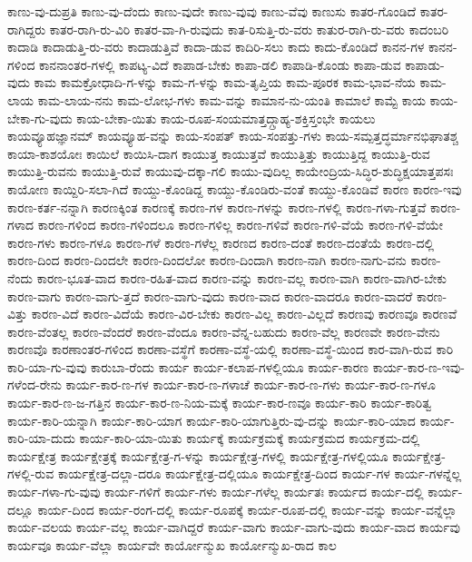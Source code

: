 {ಕಾಣು-ವು-ದುಪ್ರತಿ
ಕಾಣು-ವು-ದೆಂದು
ಕಾಣು-ವುದೇ
ಕಾಣು-ವುವು
ಕಾಣು-ವೆವು
ಕಾಣುಸು
ಕಾತರ-ಗೊಂಡಿದೆ
ಕಾತರ-ರಾಗಿದ್ದರು
ಕಾತರ-ರಾಗಿ-ರು-ವಿರಿ
ಕಾತರ-ವಾ-ಗಿ-ರುವುದು
ಕಾತ-ರಿಸುತ್ತಿ-ರು-ವರು
ಕಾತುರ-ರಾಗಿ-ರು-ವರು
ಕಾದಂಬರಿ
ಕಾದಾಡಿ
ಕಾದಾಡುತ್ತಿ-ರು-ವರು
ಕಾದಾಡುತ್ತಿವೆ
ಕಾದಾ-ಡುವ
ಕಾದಿರಿ-ಸಲು
ಕಾದು
ಕಾದು-ಕೊಂಡಿದೆ
ಕಾನನ-ಗಳ
ಕಾನನ-ಗಳಿಂದ
ಕಾನನಾಂತರ-ಗಳಲ್ಲಿ
ಕಾಪಟ್ಯ-ವಿದೆ
ಕಾಪಾಡ-ಬೇಕು
ಕಾಪಾ-ಡಲಿ
ಕಾಪಾಡಿ-ಕೊಂಡು
ಕಾಪಾ-ಡುವ
ಕಾಪಾಡು-ವುದು
ಕಾಮ
ಕಾಮಕ್ರೋಧಾದಿ-ಗ-ಳನ್ನು
ಕಾಮ-ಗ-ಳನ್ನು
ಕಾಮ-ತೃಪ್ತಿಯ
ಕಾಮ-ಪೂರಕ
ಕಾಮ-ಭಾವ-ನೆಯ
ಕಾಮ-ಲಾಯ
ಕಾಮ-ಲಾಯ-ನನು
ಕಾಮ-ಲೋಭ-ಗಳು
ಕಾಮ-ವನ್ನು
ಕಾಮಾನ-ನು-ಯಂತಿ
ಕಾಮಾಲೆ
ಕಾಮ್ಟೆ
ಕಾಯ
ಕಾಯ-ಬೇಕಾ-ಗು-ವುದು
ಕಾಯ-ಬೇಕಾ-ಯಿತು
ಕಾಯ-ರೂಪ-ಸಂಯಮಾತ್ತದ್ಗ್ರಾಹ್ಯ-ಶಕ್ತಿಸ್ತಂಭೇ
ಕಾಯಲು
ಕಾಯವ್ಯೂಹಜ್ಞಾನಮ್
ಕಾಯವ್ಯೂಹ-ವನ್ನು
ಕಾಯ-ಸಂಪತ್
ಕಾಯ-ಸಂಪತ್ತು-ಗಳು
ಕಾಯ-ಸಮ್ಪತ್ತದ್ಧರ್ಮಾನಭಿಘಾತಶ್ಚ
ಕಾಯಾ-ಕಾಶಯೋಃ
ಕಾಯಿಲೆ
ಕಾಯಿಸಿ-ದಾಗ
ಕಾಯುತ್ತ
ಕಾಯುತ್ತವೆ
ಕಾಯುತ್ತಿತ್ತು
ಕಾಯುತ್ತಿದ್ದ
ಕಾಯುತ್ತಿ-ರುವ
ಕಾಯುತ್ತಿ-ರುವನು
ಕಾಯುತ್ತಿ-ರುವೆ
ಕಾಯುವು-ದಕ್ಕಾ-ಗಲಿ
ಕಾಯು-ವುದಿಲ್ಲ
ಕಾಯೇಂದ್ರಿಯ-ಸಿದ್ಧಿರ-ಶುದ್ಧಿಕ್ಷಯಾತ್ತಪಸಃ
ಕಾಯೋಣ
ಕಾಯ್ದಿರಿ-ಸಲಾ-ಗಿದೆ
ಕಾಯ್ದು-ಕೊಂಡಿದ್ದ
ಕಾಯ್ದು-ಕೊಂಡಿರು-ವಂತೆ
ಕಾಯ್ದು-ಕೊಂಡಿವೆ
ಕಾರಣ
ಕಾರಣ-ಇವು
ಕಾರಣ-ಕರ್ತ-ನನ್ನಾಗಿ
ಕಾರಣಕ್ಕಿಂತ
ಕಾರಣಕ್ಕೆ
ಕಾರಣ-ಗಳ
ಕಾರಣ-ಗಳನ್ನು
ಕಾರಣ-ಗಳಲ್ಲಿ
ಕಾರಣ-ಗಳಾ-ಗುತ್ತವೆ
ಕಾರಣ-ಗಳಾದ
ಕಾರಣ-ಗಳಿಂದ
ಕಾರಣ-ಗಳಿಂದಲೂ
ಕಾರಣ-ಗಳಿಲ್ಲ
ಕಾರಣ-ಗಳಿವೆ
ಕಾರಣ-ಗಳಿ-ವೆಯೆ
ಕಾರಣ-ಗಳಿ-ವೆಯೇ
ಕಾರಣ-ಗಳು
ಕಾರಣ-ಗಳೂ
ಕಾರಣ-ಗಳೆ
ಕಾರಣ-ಗಳೆಲ್ಲ
ಕಾರಣದ
ಕಾರಣ-ದಂತೆ
ಕಾರಣ-ದಂತೆಯೆ
ಕಾರಣ-ದಲ್ಲಿ
ಕಾರಣ-ದಿಂದ
ಕಾರಣ-ದಿಂದಲೇ
ಕಾರಣ-ದಿಂದಲೋ
ಕಾರಣ-ದಿಂದಾಗಿ
ಕಾರಣ-ನಾಗಿ
ಕಾರಣ-ನಾಗು-ವನು
ಕಾರಣ-ನೆಂದು
ಕಾರಣ-ಭೂತ-ವಾದ
ಕಾರಣ-ರಹಿತ-ವಾದ
ಕಾರಣ-ವನ್ನು
ಕಾರಣ-ವಲ್ಲ
ಕಾರಣ-ವಾಗಿ
ಕಾರಣ-ವಾಗಿರ-ಬೇಕು
ಕಾರಣ-ವಾಗು
ಕಾರಣ-ವಾಗು-ತ್ತದೆ
ಕಾರಣ-ವಾಗು-ವುದು
ಕಾರಣ-ವಾದ
ಕಾರಣ-ವಾದರೂ
ಕಾರಣ-ವಾದರೆ
ಕಾರಣ-ವಿತ್ತು
ಕಾರಣ-ವಿದೆ
ಕಾರಣ-ವಿದೆಯೆ
ಕಾರಣ-ವಿರ-ಬೇಕು
ಕಾರಣ-ವಿಲ್ಲ
ಕಾರಣ-ವಿಲ್ಲದೆ
ಕಾರಣವು
ಕಾರಣವೂ
ಕಾರಣವೆ
ಕಾರಣ-ವೆಂತಲ್ಲ
ಕಾರಣ-ವೆಂದರೆ
ಕಾರಣ-ವೆಂದೂ
ಕಾರಣ-ವೆನ್ನ-ಬಹುದು
ಕಾರಣ-ವೆಲ್ಲ
ಕಾರಣವೇ
ಕಾರಣ-ವೇನು
ಕಾರಣವೊ
ಕಾರಣಾಂತರ-ಗಳಿಂದ
ಕಾರಣಾ-ವಸ್ಥೆಗೆ
ಕಾರಣಾ-ವಸ್ಥೆ-ಯಲ್ಲಿ
ಕಾರಣಾ-ವಸ್ಥೆ-ಯಿಂದ
ಕಾರ-ವಾಗಿ-ರುವ
ಕಾರಿ
ಕಾರಿ-ಯಾ-ಗು-ವುವು
ಕಾರುಬಾ-ರೆಂದು
ಕಾರ್ಯ
ಕಾರ್ಯ-ಕಲಾಪ-ಗಳಲ್ಲಿಯೂ
ಕಾರ್ಯ-ಕಾರಣ
ಕಾರ್ಯ-ಕಾರ-ಣ-ಇವು-ಗಳೆಂದ-ರೇನು
ಕಾರ್ಯ-ಕಾರ-ಣ-ಗಳ
ಕಾರ್ಯ-ಕಾರ-ಣ-ಗಳಾಚೆ
ಕಾರ್ಯ-ಕಾರ-ಣ-ಗಳು
ಕಾರ್ಯ-ಕಾರ-ಣ-ಗಳೂ
ಕಾರ್ಯ-ಕಾರ-ಣ-ಜ-ಗತ್ತಿನ
ಕಾರ್ಯ-ಕಾರ-ಣ-ನಿಯ-ಮಕ್ಕೆ
ಕಾರ್ಯ-ಕಾರ-ಣವೂ
ಕಾರ್ಯ-ಕಾರಿ
ಕಾರ್ಯ-ಕಾರಿತ್ವ
ಕಾರ್ಯ-ಕಾರಿ-ಯನ್ನಾಗಿ
ಕಾರ್ಯ-ಕಾರಿ-ಯಾಗ
ಕಾರ್ಯ-ಕಾರಿ-ಯಾಗುತ್ತಿರು-ವು-ದನ್ನು
ಕಾರ್ಯ-ಕಾರಿ-ಯಾದ
ಕಾರ್ಯ-ಕಾರಿ-ಯಾ-ದುದು
ಕಾರ್ಯ-ಕಾರಿ-ಯಾ-ಯಿತು
ಕಾರ್ಯಕ್ಕೆ
ಕಾರ್ಯಕ್ರಮಕ್ಕೆ
ಕಾರ್ಯಕ್ರಮದ
ಕಾರ್ಯಕ್ರಮ-ದಲ್ಲಿ
ಕಾರ್ಯಕ್ಷೇತ್ರ
ಕಾರ್ಯಕ್ಷೇತ್ರಕ್ಕೆ
ಕಾರ್ಯಕ್ಷೇತ್ರ-ಗ-ಳನ್ನು
ಕಾರ್ಯಕ್ಷೇತ್ರ-ಗಳಲ್ಲಿ
ಕಾರ್ಯಕ್ಷೇತ್ರ-ಗಳಲ್ಲಿಯೂ
ಕಾರ್ಯಕ್ಷೇತ್ರ-ಗಳಲ್ಲಿ-ರುವ
ಕಾರ್ಯಕ್ಷೇತ್ರ-ದಲ್ಲಾ-ದರೂ
ಕಾರ್ಯಕ್ಷೇತ್ರ-ದಲ್ಲಿಯೂ
ಕಾರ್ಯಕ್ಷೇತ್ರ-ದಿಂದ
ಕಾರ್ಯ-ಗಳ
ಕಾರ್ಯ-ಗಳನ್ನೆಲ್ಲ
ಕಾರ್ಯ-ಗಳಾ-ಗು-ವುವು
ಕಾರ್ಯ-ಗಳಿಗೆ
ಕಾರ್ಯ-ಗಳು
ಕಾರ್ಯ-ಗಳೆಲ್ಲ
ಕಾರ್ಯತಃ
ಕಾರ್ಯದ
ಕಾರ್ಯ-ದಲ್ಲಿ
ಕಾರ್ಯ-ದಲ್ಲೂ
ಕಾರ್ಯ-ದಿಂದ
ಕಾರ್ಯ-ರಂಗ-ದಲ್ಲಿ
ಕಾರ್ಯ-ರೂಪಕ್ಕೆ
ಕಾರ್ಯ-ರೂಪ-ದಲ್ಲಿ
ಕಾರ್ಯ-ವನ್ನು
ಕಾರ್ಯ-ವನ್ನೆಲ್ಲಾ
ಕಾರ್ಯ-ವಲಯ
ಕಾರ್ಯ-ವಲ್ಲ
ಕಾರ್ಯ-ವಾಗಿದ್ದರೆ
ಕಾರ್ಯ-ವಾಗು
ಕಾರ್ಯ-ವಾಗು-ವುದು
ಕಾರ್ಯ-ವಾದ
ಕಾರ್ಯವು
ಕಾರ್ಯವೂ
ಕಾರ್ಯ-ವೆಲ್ಲಾ
ಕಾರ್ಯವೇ
ಕಾರ್ಯೋನ್ಮುಖ
ಕಾರ್ಯೋನ್ಮುಖ-ರಾದ
ಕಾಲ
}

